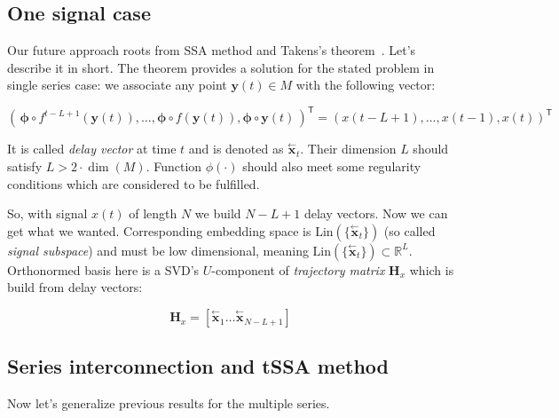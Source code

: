 \documentclass[referee, pdflatex]{sn-jnl}
\theoremstyle{definition}
\theoremstyle{plain}
\newcommand{\delayV}[1]{\overset{\leftarrow}{\mathbf{x}}_{#1}}
\begin{document}
	\subsection{One signal case}
	
	Our future approach roots from SSA method and Takens's theorem~\cite{citeulike:2735031}. Let's describe it in short. The theorem provides a solution for the stated problem in single series case: we associate any point $ \mathbf{y}(t) \in M $ with the following vector:
	
	\[
	( \, \boldsymbol{\phi} \circ f^{t - L + 1}(\mathbf{y}(t)), \ldots , \boldsymbol{\phi} \circ f(\mathbf{y}(t)), \boldsymbol{\phi} \circ \mathbf{y}(t) \,)^{\mathsf{T}} = (x(t - L + 1), \ldots , x(t-1), x(t))^{\mathsf{T}}
	\] 
	
	It is called \emph{delay vector} at time $ t $ and is denoted as $ \delayV{t} $. Their dimension $ L $ should satisfy $ L > 2 \cdot \dim(M) $. Function $ \phi(\cdot) $ should also meet some regularity conditions which are considered to be fulfilled.
	
	So, with signal $ x(t) $ of length $ N $ we build $ N - L + 1 $ delay vectors. Now we can get what we wanted. Corresponding embedding space is $ \text{Lin}(\{\delayV{t}\}) $ (so called \emph{signal subspace}) and must be low dimensional, meaning $ \text{Lin}(\{\delayV{t}\}) \subset \mathbb{R}^L $. Orthonormed basis here is a SVD's $ U $-component of \emph{trajectory matrix} $ \mathbf{H}_x $ which is build from delay vectors:
	
	\[
		\mathbf{H}_x = [ \delayV{1} \ldots  \delayV{N - L + 1}]
	\]
	
	\subsection{Series interconnection and tSSA method}\label{sec:tssa_method}
	
	Now let's generalize previous results for the multiple series.
	
\end{document}
